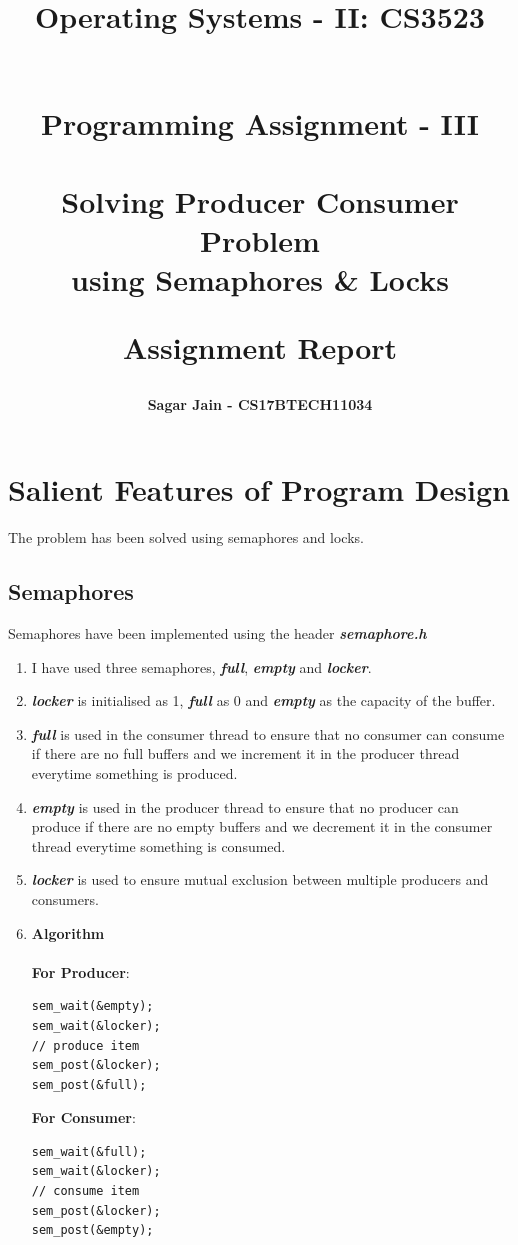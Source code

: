 \documentclass[a4paper,12pt]{report}
\begin{document}
\title{
\textbf{Operating Systems - II: CS3523}\\~\\
\begin{large}
\textbf{Programming Assignment - III\\~\\Solving Producer Consumer Problem\\using Semaphores
\& Locks\\}
\end{large}
\begin{large}
\textbf{Assignment Report}
\end{large}
}
\author{\textbf{Sagar Jain - CS17BTECH11034}\\}
\maketitle
\begin{large}
\tableofcontents
\end{large}
\newpage
\section{Salient Features of Program Design}
The problem has been solved using semaphores and locks.
\subsection{Semaphores}
Semaphores have been implemented using the header \textbf{\textit{semaphore.h}}
\begin{enumerate}
\item I have used three semaphores, \textbf{\textit{full}}, \textbf{\textit{empty}} and \textbf{\textit{locker}}.
\item \textbf{\textit{locker}} is initialised as 1, \textbf{\textit{full}} as 0 and \textbf{\textit{empty}} as the capacity of the buffer.
\item \textbf{\textit{full}} is used in the consumer thread to ensure that no consumer can consume if there are no full buffers and we increment it in the producer thread everytime something is produced.
\item \textbf{\textit{empty}} is used in the producer thread to ensure that no producer can produce if there are no empty buffers and we decrement it in the consumer thread everytime something is consumed.
\item \textbf{\textit{locker}} is used to ensure mutual exclusion between multiple producers and consumers.
\item \textbf{Algorithm}\\\\
\textbf{For Producer}:
\begin{lstlisting}
sem_wait(&empty);
sem_wait(&locker);
// produce item
sem_post(&locker);
sem_post(&full);
\end{lstlisting}
\textbf{For Consumer}:
\begin{lstlisting}
sem_wait(&full);
sem_wait(&locker);
// consume item
sem_post(&locker);
sem_post(&empty);
\end{lstlisting}
\end{enumerate}
\end{document}
